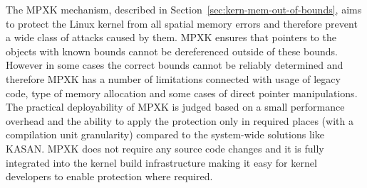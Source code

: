 The MPXK mechanism, described in Section~\ref{sec:kern-mem-out-of-bounds}, aims to protect the Linux kernel from all spatial memory errors and therefore prevent a wide class of attacks caused by them. MPXK ensures that pointers to the objects with known bounds cannot be dereferenced outside of these bounds. However in some cases the correct bounds cannot be reliably determined and therefore MPXK has a number of limitations connected with usage of legacy code, type of memory allocation and some cases of direct pointer manipulations. The practical deployability of MPXK is judged based on a small performance overhead and the ability to apply the protection only in required places (with a compilation unit granularity) compared to the system-wide solutions like KASAN. MPXK does not require any source code changes and it is fully integrated into the kernel build infrastructure making it easy for kernel developers to enable protection where required.  

